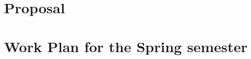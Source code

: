 \documentclass{layout/si-msc-proposal}
\begin{document}

    \section{Proposal}\label{sec:proposal}
    


    \section{Work Plan for the Spring semester}\label{sec:work-plan-for-the-spring-semester}
    


    \newpage
    \nocite{*}
    
\end{document}

